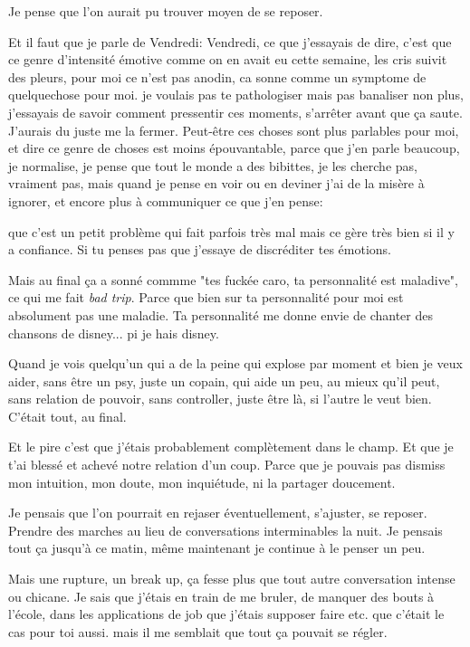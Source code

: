 Je pense que l'on aurait pu trouver moyen de se reposer.

Et il faut que je parle de Vendredi:
Vendredi, ce que j'essayais de dire, c'est que ce genre d'intensité émotive
comme on en avait eu cette semaine, les cris suivit des pleurs, pour moi ce
n'est pas anodin, ca sonne comme un symptome de quelquechose pour moi. je
voulais pas te pathologiser mais pas banaliser non plus,
j'essayais de savoir comment pressentir ces moments, s'arrêter avant que ça
saute. \\ J'aurais du juste me la fermer.
\newpage
Peut-être ces choses sont plus parlables pour moi, et dire ce
genre de choses est moins épouvantable, parce que j'en parle beaucoup, je
normalise, je pense que tout le monde a des bibittes, je les cherche pas,
vraiment pas, mais quand je pense en voir ou en deviner  j'ai de la misère à
ignorer, et encore plus à communiquer ce que j'en pense:

que c'est un petit problème qui fait parfois très mal mais ce gère très bien si
il y a confiance. Si tu penses pas que j'essaye de discréditer tes émotions.

Mais au final ça a sonné commme "tes fuckée caro, ta
personnalité est maladive", ce qui me fait \emph{bad trip}.  Parce que bien sur ta
personnalité pour moi est absolument pas une maladie.
Ta personnalité me donne envie de chanter des chansons de disney...
\hfill pi je hais disney.


Quand je vois quelqu'un qui a de la peine qui
explose par moment et bien je veux aider, sans être un psy, juste un copain, qui
aide un peu, au mieux qu'il peut, sans relation de pouvoir, sans controller,
juste être là, si l'autre le veut bien. C'était tout, au final.

Et le pire c'est que j'étais probablement complètement dans le champ.
Et que je t'ai blessé et achevé notre relation d'un coup.
Parce que je pouvais pas dismiss mon intuition, mon doute, mon inquiétude,
ni la partager doucement.

Je pensais que l'on pourrait en rejaser éventuellement, s'ajuster, 
se reposer. Prendre des marches au lieu de conversations interminables
la nuit. Je pensais tout ça jusqu'à ce matin, même maintenant je continue
à le penser un peu.

Mais une rupture, un break up, ça fesse plus que tout autre conversation
intense ou chicane. Je sais que j'étais en train de me bruler, de manquer des
bouts à l'école, dans les applications de job que j'étais supposer faire etc. 
que c'était le cas pour toi aussi.
mais il me semblait que tout ça pouvait se régler.

